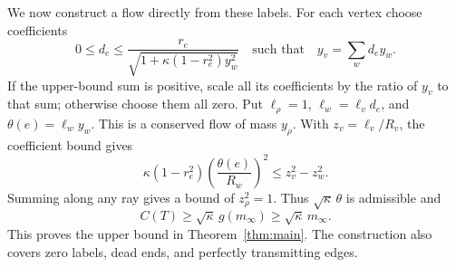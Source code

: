 We now construct a flow directly from these labels. For each vertex
choose coefficients
\[
 0\leq d_e\leq\frac{r_e}{\sqrt{1+\kappa(1-r_e^2)y_w^2}}
 \quad\text{such that}\quad y_v=\sum_w d_e y_w.
\]
If the upper-bound sum is positive, scale all its coefficients by the
ratio of $y_v$ to that sum; otherwise choose them all zero. Put
$\ell_\rho=1$, $\ell_w=\ell_vd_e$, and
$\theta(e)=\ell_w y_w$. This is a conserved flow of mass
$y_\rho$. With $z_v=\ell_v/R_v$, the coefficient bound gives
\[
 \kappa(1-r_e^2)\left(\frac{\theta(e)}{R_w}\right)^2
 \leq z_v^2-z_w^2.
\]
Summing along any ray gives a bound of $z_\rho^2=1$.
Thus $\sqrt\kappa\,\theta$ is admissible and
\begin{equation}\label{eq:strong-upper}
 C(T)\geq\sqrt\kappa\,g(m_\infty)
          \geq\sqrt\kappa\,m_\infty.
\end{equation}
This proves the upper bound in Theorem~\ref{thm:main}. The construction
also covers zero labels, dead ends, and perfectly transmitting edges.
